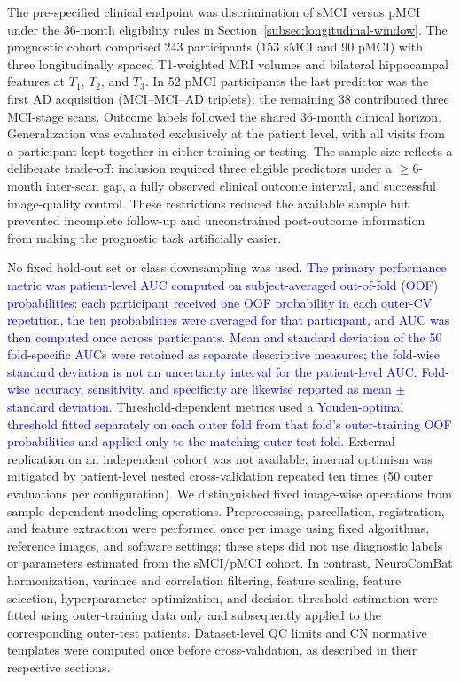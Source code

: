 \documentclass[review]{elsarticle}
\newcommand{\corrigir}[2]{%
	\textcolor{red}{\sout{#1}} %
	\textcolor{blue}{#2}%
}
\begin{document}
	The pre-specified clinical endpoint was discrimination of sMCI versus pMCI under the 36-month eligibility rules in Section~\ref{subsec:longitudinal-window}. The prognostic cohort comprised 243 participants (153 sMCI and 90 pMCI) with three longitudinally spaced T1-weighted MRI volumes and bilateral hippocampal features at $T_1$, $T_2$, and $T_3$. In 52 pMCI participants the last predictor was the first AD acquisition (MCI--MCI--AD triplets); the remaining 38 contributed three MCI-stage scans. Outcome labels followed the shared 36-month clinical horizon. Generalization was evaluated exclusively at the patient level, with all visits from a participant kept together in either training or testing. The sample size reflects a deliberate trade-off: inclusion required three eligible predictors under a $\geq6$-month inter-scan gap, a fully observed clinical outcome interval, and successful image-quality control. These restrictions reduced the available sample but prevented incomplete follow-up and unconstrained post-outcome information from making the prognostic task artificially easier.
	
	No fixed hold-out set or class downsampling was used. \corrigir{}{The primary performance metric was patient-level AUC computed on subject-averaged out-of-fold (OOF) probabilities: each participant received one OOF probability in each outer-CV repetition, the ten probabilities were averaged for that participant, and AUC was then computed once across participants. Mean and standard deviation of the 50 fold-specific AUCs were retained as separate descriptive measures; the fold-wise standard deviation is not an uncertainty interval for the patient-level AUC. Fold-wise accuracy, sensitivity, and specificity are likewise reported as mean $\pm$ standard deviation.} Threshold-dependent metrics used a \corrigir{}{Youden-optimal threshold fitted separately on each outer fold from that fold's outer-training OOF probabilities and applied only to the matching outer-test fold.} External replication on an independent cohort was not available; internal optimism was mitigated by patient-level nested cross-validation repeated ten times (50 outer evaluations per configuration). We distinguished fixed image-wise operations from sample-dependent modeling operations. Preprocessing, parcellation, registration, and feature extraction were performed once per image using fixed algorithms, reference images, and software settings; these steps did not use diagnostic labels or parameters estimated from the sMCI/pMCI cohort. In contrast, NeuroComBat harmonization, variance and correlation filtering, feature scaling, feature selection, hyperparameter optimization, and decision-threshold estimation were fitted using outer-training data only and subsequently applied to the corresponding outer-test patients. Dataset-level QC limits and CN normative templates were computed once before cross-validation, as described in their respective sections.
	
\end{document}
